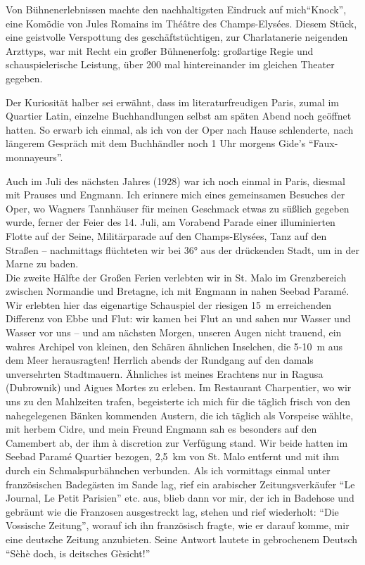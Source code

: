\documentclass[a5paper,pagesize,10pt,twoside=true]{scrbook}
\renewcommand{\marginpar}[2][]{}
\begin{document}
Von Bühnenerlebnissen machte den nachhaltigsten Eindruck auf mich\linebreak \enquote{Knock}, eine Komödie von Jules Romains im Théâtre des Champs-Elysées. Diesem Stück, eine geistvolle Verspottung des geschäftstüchtigen, zur Charlatanerie neigenden Arzttyps, war mit Recht ein großer Bühnenerfolg: großartige Regie und schauspielerische Leistung, über 200 mal hintereinander im gleichen Theater gegeben.

\marginpar{569}
Der Kuriosität halber sei erwähnt, dass im literaturfreudigen Paris, zumal im Quartier Latin, einzelne Buchhandlungen selbst am späten Abend noch geöffnet hatten. So erwarb ich einmal, als ich von der Oper nach Hause schlenderte, nach längerem Gespräch mit dem Buchhändler noch 1 Uhr morgens Gide's \enquote{Faux-monnayeurs}.

Auch im Juli des nächsten Jahres (1928) war ich noch einmal in Paris, diesmal mit Prauses und Engmann. Ich erinnere mich eines gemeinsamen Besuches der Oper, wo Wagners Tannhäuser für meinen Geschmack etwas zu süßlich gegeben wurde, ferner der Feier des 14. Juli, am Vorabend Parade einer illuminierten Flotte auf der Seine, Militärparade auf den Champs-Elysées, Tanz auf den Straßen -- nachmittags flüchteten wir bei 36° aus der drückenden Stadt, um in der Marne zu baden.\\

Die zweite Hälfte der Großen Ferien verlebten wir in St. Malo im Grenzbereich zwischen Normandie und Bretagne, ich mit Engmann in nahen Seebad Paramé. Wir erlebten hier das eigenartige Schauspiel der riesigen 15~m erreichenden Differenz von Ebbe und Flut: wir kamen bei Flut an und sahen nur Wasser und Wasser vor uns -- und am nächsten Morgen, unseren Augen nicht trauend, ein wahres Archipel von kleinen, den Schären ähnlichen Inselchen, die 5-10~m aus dem Meer herausragten! Herrlich abends der Rundgang auf den damals unversehrten Stadtmauern. Ähnliches ist meines Erachtens nur in Ragusa (Dubrownik) und Aigues Mortes zu erleben. Im Restaurant Charpentier, wo wir uns zu den Mahlzeiten trafen, begeisterte ich mich für die täglich frisch von den nahegelegenen Bänken kommenden Austern, die ich täglich als Vorspeise wählte, mit herbem Cidre, und mein Freund Engmann sah es besonders auf den Camembert ab, der ihm à discretion zur Verfügung stand. Wir beide hatten im Seebad Paramé Quartier bezogen, 2,5~km von St. Malo entfernt und mit ihm durch ein Schmalspurbähnchen verbunden. Als ich vormittags einmal unter französischen Badegästen im Sande lag, rief ein arabischer Zeitungsverkäufer \enquote{Le Journal, Le Petit Parisien} etc. aus, blieb dann vor mir, der ich in Badehose und gebräunt wie die Franzosen ausgestreckt lag, stehen und rief wiederholt: \enquote{Die Vossische Zeitung}, worauf ich ihn französisch fragte, wie er darauf komme, mir eine deutsche Zeitung anzubieten. Seine Antwort lautete in gebrochenem Deutsch \enquote{Sèhè doch, is deitsches Gèsicht!}
\end{document}
